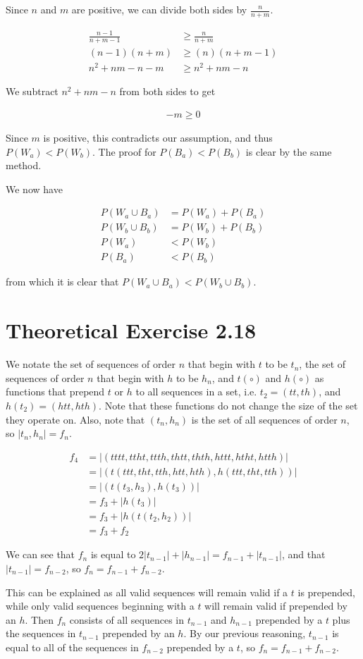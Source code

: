 \documentclass[]{article}
\begin{document}
Since $n$ and $m$ are positive, we can divide both sides by $\frac{n}{n+m}$.

\begin{align*}
	\frac{n-1}{n+m-1} &\geq \frac{n}{n+m} \\
	(n-1)(n+m) &\geq (n)(n+m-1) \\
	n^2 + nm - n - m &\geq n^2 + nm - n
\end{align*}

We subtract $n^2 + nm - n$ from both sides to get

\begin{align*}
	-m \geq 0
\end{align*}

Since $m$ is positive, this contradicts our assumption, and thus $P(W_a) < P(W_b)$.
The proof for $P(B_a) < P(B_b)$ is clear by the same method.

We now have 

\begin{align*}
	P(W_a \cup B_a) &= P(W_a) + P(B_a) \\
	P(W_b \cup B_b) &= P(W_b) + P(B_b) \\
	P(W_a) &< P(W_b) \\
	P(B_a) &< P(B_b)
\end{align*}

from which it is clear that $P(W_a \cup B_a) < P(W_b \cup B_b)$. 

\section{Theoretical Exercise 2.18}

We notate the set of sequences of order $n$ that begin with $t$ to be $t_n$, the set of sequences of order $n$ that begin with $h$ to be $h_n$, and $t(\circ)$ and $h(\circ)$ as functions that prepend $t$ or $h$ to all sequences in a set, i.e. $t_2 = (tt, th)$, and $h(t_2) = (htt, hth)$. Note that these functions do not change the size of the set they operate on. Also, note that $(t_n, h_n)$ is the set of all sequences of order $n$, so $|t_n, h_n| = f_n$.

\begin{align*}
	f_4 &= |( tttt, ttht, ttth, thtt, thth, httt, htht, htth )| \\
	&= | ( t(ttt, tht, tth, htt, hth), h(ttt, tht, tth) ) | \\
	&= | ( t( t_3, h_3 ), h(t_3) ) | \\
	&= f_3 + |h(t_3)| \\
	&= f_3 + |h(t(t_2, h_2))| \\
	&= f_3 + f_2
\end{align*}

We can see that $f_n$ is equal to $2|t_{n-1}| + |h_{n-1}| = f_{n-1} + |t_{n-1}|$, and that $|t_{n-1}| = f_{n-2}$, so $f_n = f_{n-1} + f_{n-2}$.

This can be explained as all valid sequences will remain valid if a $t$ is prepended, while only valid sequences beginning with a $t$ will remain valid if prepended by an $h$. 
Then $f_n$ consists of all sequences in $t_{n-1}$ and $h_{n-1}$ prepended by a $t$ plus the sequences in $t_{n-1}$ prepended by an $h$.
By our previous reasoning, $t_{n-1}$ is equal to all of the sequences in $f_{n-2}$ prepended by a $t$, so $f_n = f_{n-1} + f_{n-2}$.
\end{document}

